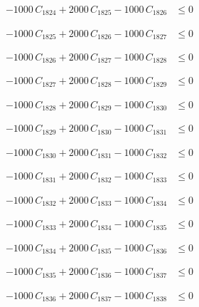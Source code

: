 \documentclass[a4paper,11pt]{article}
\begin{document}
\begin{align}
-1000\,C_{1824} + 2000\,C_{1825} - 1000\,C_{1826} &\leq 0 \nonumber
\end{align}

\begin{align}
-1000\,C_{1825} + 2000\,C_{1826} - 1000\,C_{1827} &\leq 0 \nonumber
\end{align}

\begin{align}
-1000\,C_{1826} + 2000\,C_{1827} - 1000\,C_{1828} &\leq 0 \nonumber
\end{align}

\begin{align}
-1000\,C_{1827} + 2000\,C_{1828} - 1000\,C_{1829} &\leq 0 \nonumber
\end{align}

\begin{align}
-1000\,C_{1828} + 2000\,C_{1829} - 1000\,C_{1830} &\leq 0 \nonumber
\end{align}

\begin{align}
-1000\,C_{1829} + 2000\,C_{1830} - 1000\,C_{1831} &\leq 0 \nonumber
\end{align}

\begin{align}
-1000\,C_{1830} + 2000\,C_{1831} - 1000\,C_{1832} &\leq 0 \nonumber
\end{align}

\begin{align}
-1000\,C_{1831} + 2000\,C_{1832} - 1000\,C_{1833} &\leq 0 \nonumber
\end{align}

\begin{align}
-1000\,C_{1832} + 2000\,C_{1833} - 1000\,C_{1834} &\leq 0 \nonumber
\end{align}

\begin{align}
-1000\,C_{1833} + 2000\,C_{1834} - 1000\,C_{1835} &\leq 0 \nonumber
\end{align}

\begin{align}
-1000\,C_{1834} + 2000\,C_{1835} - 1000\,C_{1836} &\leq 0 \nonumber
\end{align}

\begin{align}
-1000\,C_{1835} + 2000\,C_{1836} - 1000\,C_{1837} &\leq 0 \nonumber
\end{align}

\begin{align}
-1000\,C_{1836} + 2000\,C_{1837} - 1000\,C_{1838} &\leq 0 \nonumber
\end{align}
\end{document}

